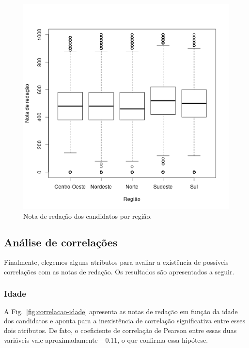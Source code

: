 \documentclass[12pt]{article}
\newcommand{\reffig}[1]{Fig.~\ref{fig:#1}}
\begin{document}
\begin{minipage}{.5\textwidth}
    \begin{figure}[H]
    \includegraphics[width=\linewidth]{../regiao_nota.png}
    \caption{Nota de redação dos candidatos por região.}
    \label{fig:nota-por-regiao}
    \end{figure}
\end{minipage}
\fi

\subsection{Análise de correlações}
Finalmente, elegemos alguns atributos para avaliar a existência de possíveis correlações com as notas de redação.
Os resultados são apresentados a seguir.

\subsubsection{Idade}
A \reffig{correlacao-idade} apresenta as notas de redação em função da idade dos candidatos e aponta para a inexistência de correlação significativa entre esses dois atributos.
De fato, o coeficiente de correlação de Pearson entre essas duas variáveis vale aproximadamente $-0.11$, o que confirma essa hipótese.
\end{document}
